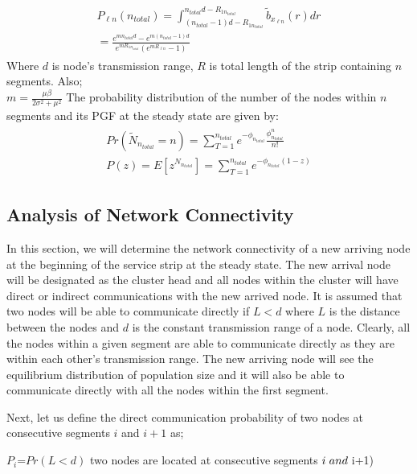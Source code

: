 \documentclass[journal]{IEEEtran}
\begin{document}
\tiny
\begin{eqnarray}
\begin{split}
P_{\ell{n}}(n_{total})=\int_{(n_{total}-1)d-R_{1n_{total}}}^{n_{total}d-R_{1n_{total}}}\tilde{b}_{x_{\ell{n}}}(r)dr \\=\frac{e^{mn_{total}d} - e^{m(n_{total}-1)d}}{e^{mR_{1n_{total}}}(e^{mR_{\ell{n}}}-1)}
\end{split}
\end{eqnarray}
\normalsize
Where $d$ is node's transmission range, $R$ is total length of the strip containing $n$ segments.
Also;\\
$m=\frac{\mu\beta}{2\sigma^{2}+\mu^2}$
The probability distribution of the number of the nodes within $n$ segments and its PGF at the steady state are given by:
\tiny
\begin{eqnarray}
\begin{split}
Pr(\tilde{N}_{n_{total}}=n)=\sum_{T=1}^{n_{total}}e^{-{\phi}_{n_{total}}}\frac{\phi_{n_{total}}^{n}}{n!} \\ P(z)=E[z^{N_{n_{total}}}]=\sum_{T=1}^{n_{total}}e^{-\phi_{n_{total}}(1-z)}
\end{split}
\end{eqnarray}
\normalsize

\subsection{Analysis of Network Connectivity}
In this section, we will determine the network connectivity of a new arriving node at the beginning of the service strip at the steady state.
The new arrival node will be designated as the cluster head and all nodes within the cluster will have direct or indirect communications with the new arrived node. It is assumed that two nodes will be able to communicate directly if $L<d$ where $L$ is the distance between the nodes and $d$ is the constant transmission range of a node. Clearly, all the nodes within a given segment are able to communicate directly as they are within each other's transmission range. The new arriving node will see the equilibrium distribution of population size and it will also be able to communicate directly with all the nodes within the first segment.

Next, let us define the direct communication probability of two nodes at consecutive segments $i$ and $i+1$ as;

\small
$P_{i}$=$Pr(L<d)$ two nodes are located at consecutive segments $i \hspace{0.1cm}and\hspace{0.1cm} $i+1)
\normalsize
\end{document}
